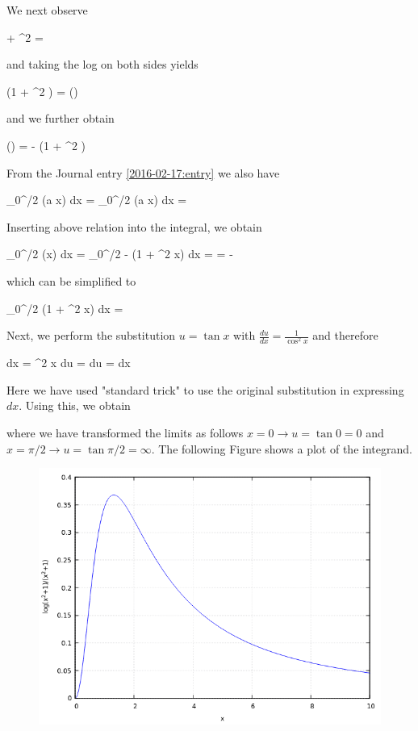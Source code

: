 We next observe

 + \tan^2 \phi= 
\eee

and taking the log on both sides yields

\bee
\ln(1 + \tan^2 \phi) = \ln()
\eee

and we further obtain

\bee
\ln(\cos \phi) = - \ln(1 + \tan^2 \phi)
\eee

From the Journal entry \ref{2016-02-17:entry} we also have 

\bee
\int_0^{\pi/2} \ln(a \sin x) dx = \int_0^{\pi/2} \ln(a \cos x) dx =  \ln {}
\eee

Inserting above relation into the integral, we obtain

\bee
\int_0^{\pi/2} \ln(\cos x) dx = \int_0^{\pi/2} - \ln(1 + \tan^2 x) dx =  \ln {} = -  
\eee

which can be simplified to

\bee
\int_0^{\pi/2} \ln(1 + \tan^2 x) dx = \pi {}
\eee

Next, we perform the substitution $u = \tan x$ with $\frac{du}{dx} = \frac{1}{\cos^2 x}$ and therefore

\bee
dx = \cos^2 x du =  du = dx
\eee

Here we have used "standard trick" to use the original substitution in expressing $dx$. Using this, we obtain

\be
\label{2018-03-21:eq2}
\ee

where we have transformed the limits as follows $x=0 \rightarrow u = \tan 0 = 0$ and $x=\pi/2 \rightarrow u = \tan \pi/2 = \infty$. The following Figure shows a plot of the integrand.

\begin{figure}[H]
	\includegraphics[scale=0.7]{images/interesting_integrals_06_2.png}
\end{figure}


